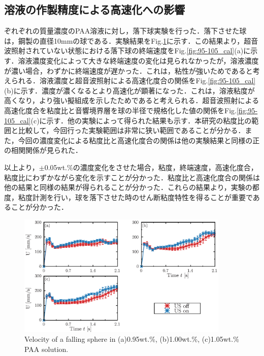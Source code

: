 \subsection{溶液の作製精度による高速化への影響}

ぞれぞれの質量濃度のPAA溶液に対し，落下球実験を行った．落下させた球は，鋼製の直径10mmの球である．実験結果をFig.\ref{fig:95-105velocity}に示す．この結果より，超音波照射されていない状態における落下球の終端速度をFig.\ref{fig:95-105_cal}(a)に示す．溶液濃度変化によって大きな終端速度の変化は見られなかったが，溶液濃度が濃い場合，わずかに終端速度が遅かった．これは，粘性が強いためであると考えられる．溶液濃度と超音波照射による高速化度合の関係をFig.\ref{fig:95-105_cal}(b)に示す．濃度が濃くなるとより高速化が顕著になった．これは，溶液粘度が高くなり，より強い擬組成を示したためであると考えられる．超音波照射による高速化度合を粘度比と音響境界層を球の半径で規格化した値の関係をFig.\ref{fig:95-105_cal}(c)に示す．他の実験によって得られた結果も示す．本研究の粘度比の範囲と比較して，今回行った実験範囲は非常に狭い範囲であることが分かる．また，今回の濃度変化による粘度比と高速化度合の関係は他の実験結果と同様の正の相関関係が見られた．

以上より，$\pm$0.05wt.\%の濃度変化をさせた場合，粘度，終端速度，高速化度合，粘度比にわずかながら変化を示すことが分かった．粘度比と高速化度合の関係は他の結果と同様の結果が得られることが分かった．これらの結果より，実験の都度，粘度計測を行い，球を落下させた時のせん断粘度特性を得ることが重要であることが分かった．

\begin{figure}[H]
    \centering
    \includegraphics[width=0.9\textwidth]{X-Appendix/concentration_diff/concentration_diff.eps}
    \caption{Velocity of a falling sphere in (a)0.95wt.\%, (b)1.00wt.\%, (c)1.05wt.\% PAA solution.}
    \label{fig:95-105velocity}
\end{figure}

